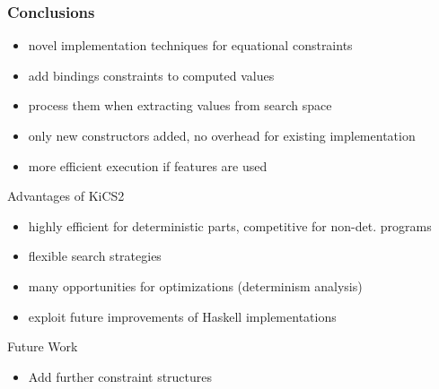 \documentclass[10pt]{beamer}
\begin{document}
\begin{frame}
\frametitle{Conclusions}
\vspace{-1ex}
\begin{block}{}
\begin{itemize}
\item novel implementation techniques for equational constraints
\item add bindings constraints to computed values
\item process them when extracting values from search space
\item only new constructors added, no overhead for existing implementation
\item more efficient execution if features are used
\end{itemize}
\end{block}
\vfill
\begin{block}{Advantages of KiCS2}
\begin{itemize}
\item highly efficient for deterministic parts, competitive for non-det. programs
\item flexible search strategies
\item many opportunities for optimizations (determinism analysis)
\item exploit future improvements of Haskell implementations
\end{itemize}
\end{block}
\vfill
\begin{block}{Future Work}
\begin{itemize}
\item Add further constraint structures
\end{itemize}
\end{block}
\end{frame}
\end{document}
